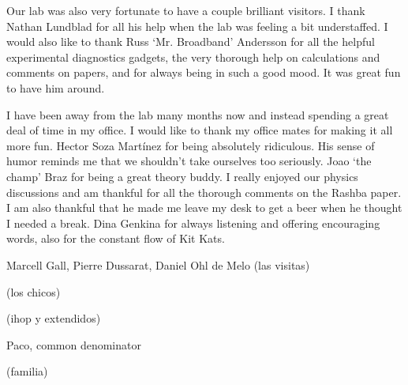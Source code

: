 Our lab was also very fortunate to have a couple brilliant visitors. I thank Nathan Lundblad for all his help when the lab was feeling a bit understaffed. I would also like to thank Russ `Mr. Broadband' Andersson for all the helpful experimental diagnostics gadgets, the very thorough help on calculations and comments on papers, and for always being in such a good mood. It was great fun to have him around. 

I have been away from the lab many months now and instead spending a great deal of time in my office. I would like to thank my office mates for making it all more fun. Hector Soza Mart\'inez for being absolutely ridiculous. His sense of humor reminds me that we shouldn't take ourselves too seriously. Joao `the champ' Braz for being a great theory buddy. I really enjoyed our physics discussions and am thankful for all the thorough comments on the Rashba paper. I am also thankful that he made me leave my desk to get a beer when he thought I needed a break. Dina Genkina for always listening and offering encouraging words, also for the constant flow of Kit Kats. 

Marcell Gall, Pierre Dussarat, Daniel Ohl de Melo (las visitas)

(los chicos) 

(ihop y extendidos)

Paco, common denominator 

(familia)




